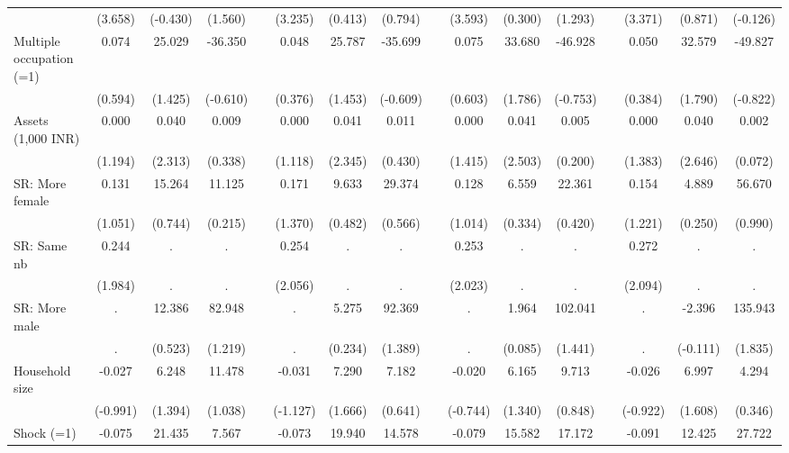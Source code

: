 {\begin{longtable}{@{\extracolsep{\fill}}lccccccccccccccc}
          & (3.658) & (-0.430) & (1.560) &       & (3.235) & (0.413) & (0.794) &       & (3.593) & (0.300) & (1.293) &       & (3.371) & (0.871) & (-0.126) \\
    Multiple occupation (=1) & 0.074 & 25.029 & -36.350 &       & 0.048 & 25.787 & -35.699 &       & 0.075 & 33.680 & -46.928 &       & 0.050 & 32.579 & -49.827 \\
          & (0.594) & (1.425) & (-0.610) &       & (0.376) & (1.453) & (-0.609) &       & (0.603) & (1.786) & (-0.753) &       & (0.384) & (1.790) & (-0.822) \\
    Assets (1,000 INR) & 0.000 & 0.040 & 0.009 &       & 0.000 & 0.041 & 0.011 &       & 0.000 & 0.041 & 0.005 &       & 0.000 & 0.040 & 0.002 \\
          & (1.194) & (2.313) & (0.338) &       & (1.118) & (2.345) & (0.430) &       & (1.415) & (2.503) & (0.200) &       & (1.383) & (2.646) & (0.072) \\
    SR: More female & 0.131 & 15.264 & 11.125 &       & 0.171 & 9.633 & 29.374 &       & 0.128 & 6.559 & 22.361 &       & 0.154 & 4.889 & 56.670 \\
          & (1.051) & (0.744) & (0.215) &       & (1.370) & (0.482) & (0.566) &       & (1.014) & (0.334) & (0.420) &       & (1.221) & (0.250) & (0.990) \\
    SR: Same nb & 0.244 & .     & .     &       & 0.254 & .     & .     &       & 0.253 & .     & .     &       & 0.272 & .     & . \\
          & (1.984) & .     & .     &       & (2.056) & .     & .     &       & (2.023) & .     & .     &       & (2.094) & .     & . \\
    SR: More male & .     & 12.386 & 82.948 &       & .     & 5.275 & 92.369 &       & .     & 1.964 & 102.041 &       & .     & -2.396 & 135.943 \\
          & .     & (0.523) & (1.219) &       & .     & (0.234) & (1.389) &       & .     & (0.085) & (1.441) &       & .     & (-0.111) & (1.835) \\
    Household size & -0.027 & 6.248 & 11.478 &       & -0.031 & 7.290 & 7.182 &       & -0.020 & 6.165 & 9.713 &       & -0.026 & 6.997 & 4.294 \\
          & (-0.991) & (1.394) & (1.038) &       & (-1.127) & (1.666) & (0.641) &       & (-0.744) & (1.340) & (0.848) &       & (-0.922) & (1.608) & (0.346) \\
    Shock (=1) & -0.075 & 21.435 & 7.567 &       & -0.073 & 19.940 & 14.578 &       & -0.079 & 15.582 & 17.172 &       & -0.091 & 12.425 & 27.722 \\

\end{longtable}}
